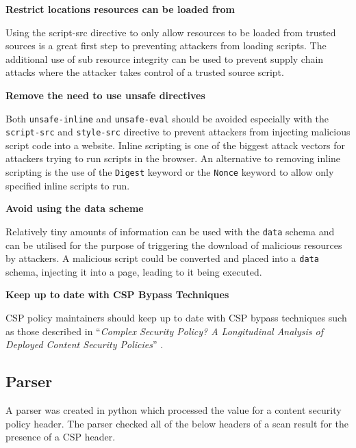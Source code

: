 \documentclass{mscreport}
\begin{document}
\vspace{0.5cm} \noindent
\textbf{Restrict locations resources can be loaded from}

\vspace{0.3cm} \noindent
Using the script-src directive to only allow resources to be loaded from trusted sources is a great first step to preventing attackers from loading scripts. The additional use of sub resource integrity can be used to prevent supply chain attacks where the attacker takes control of a trusted source script.

\vspace{0.5cm} \noindent
\textbf{Remove the need to use unsafe directives}

\vspace{0.3cm} \noindent
Both \texttt{unsafe-inline} and \texttt{unsafe-eval} should be avoided especially with the  \texttt{script-src} and \texttt{style-src} directive to prevent attackers from injecting malicious script code into a website. Inline scripting is one of the biggest attack vectors for attackers trying to run scripts in the browser. An alternative to removing inline scripting is the use of the \texttt{Digest} keyword or the \texttt{Nonce} keyword to allow only specified inline scripts to run.

\vspace{0.5cm} \noindent
\textbf{Avoid using the data scheme}

\vspace{0.3cm} \noindent
Relatively tiny amounts of information can be used with the \texttt{data} schema and can be utilised for the purpose of triggering the download of malicious resources by attackers. A malicious script could be converted and placed into a \texttt{data} schema, injecting it into a page, leading to it being executed.

\vspace{0.5cm} \noindent
\textbf{Keep up to date with CSP Bypass Techniques}

\vspace{0.3cm} \noindent
CSP policy maintainers should keep up to date with CSP bypass techniques such as those described in  ``\textit{Complex Security Policy? A Longitudinal Analysis of Deployed Content Security Policies}'' \cite{Roth2020-hg}.

\subsection{Parser}

A parser was created in python which processed the value for a content security policy header. The parser checked all of the below headers of a scan result for the presence of a CSP header.
\end{document}

